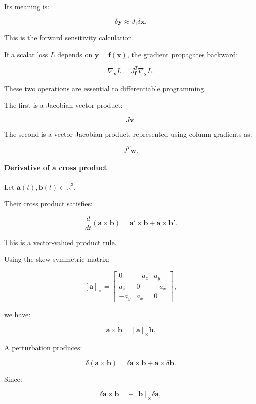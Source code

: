 Its meaning is:

\[
\delta\mathbf y\approx J_{\mathbf f}\delta\mathbf x.
\]

This is the forward sensitivity calculation.

If a scalar loss \(L\) depends on \(\mathbf y=\mathbf f(\mathbf x)\), the gradient propagates backward:

\[
\boxed{ \nabla_{\mathbf x}L = J_{\mathbf f}^T\nabla_{\mathbf y}L }.
\]

These two operations are essential to differentiable programming.

The first is a Jacobian-vector product:

\[
J\mathbf v.
\]

The second is a vector-Jacobian product, represented using column gradients as:

\[
J^T\mathbf w.
\]

\paragraph{Derivative of a cross product}\label{02-foundations-ii-ch027-derivative-of-a-cross-product}

\hypertarget{02-foundations-ii-ch027-derivative-of-a-cross-product}{}

Let \(\mathbf a(t),\mathbf b(t)\in\mathbb R^3\).

Their cross product satisfies:

\[
\frac d{dt}(\mathbf a\times\mathbf b) = \mathbf a'\times\mathbf b+ \mathbf a\times\mathbf b'.
\]

This is a vector-valued product rule.

Using the skew-symmetric matrix:

\[
[\mathbf a]_\times= \begin{bmatrix} 0&-a_z&a_y\\ a_z&0&-a_x\\ -a_y&a_x&0 \end{bmatrix},
\]

we have:

\[
\mathbf a\times\mathbf b=[\mathbf a]_\times\mathbf b.
\]

A perturbation produces:

\[
\delta(\mathbf a\times\mathbf b) = \delta\mathbf a\times\mathbf b+ \mathbf a\times\delta\mathbf b.
\]

Since:

\[
\delta\mathbf a\times\mathbf b = -[\mathbf b]_\times\delta\mathbf a,
\]

